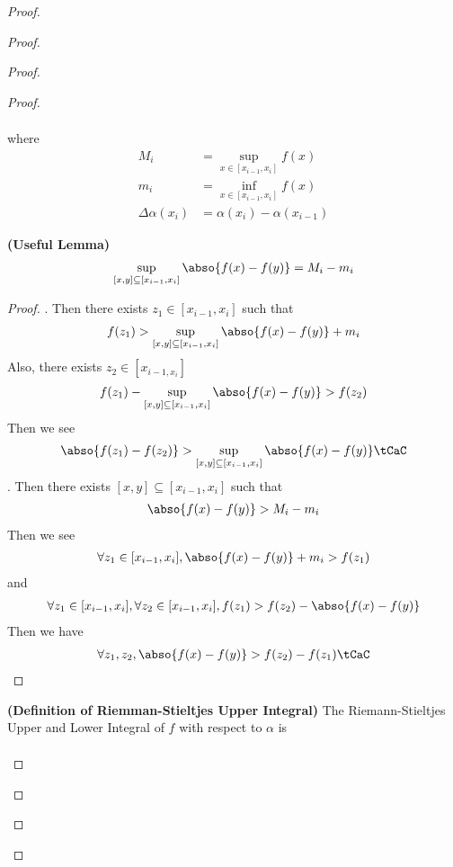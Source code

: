 \documentclass{report}
\begin{document}
\begin{proof}
\begin{proof}
\begin{proof}
\begin{proof}
\begin{definition}
\begin{align*}
\end{align*}
where 
\begin{align*}
  M_i&=\sup_{x\in [x_{i-1},x_i]}f(x)\\
m_i&=\inf_{x\in [x_{i-1},x_i]}f(x)\\
\Delta \alpha (x_i)&=\alpha (x_i)-\alpha (x_{i-1})
\end{align*}
\end{definition}
\begin{theorem}
\label{7.1.7}
\textbf{(Useful Lemma)} 
\begin{align*}
\sup_{[x,y]\subseteq [x_{i-1},x_i]}\abso{f(x)-f(y)}= M_i-m_i
\end{align*}
\end{theorem}
\begin{proof}
. Then there exists $z_1\in [x_{i-1},x_i]$ such that 
\begin{align*}
f(z_1)>\sup_{[x,y]\subseteq [x_{i-1},x_i]}\abso{f(x)-f(y)}+m_i
\end{align*}
Also, there exists $z_2\in [x_{i-1,x_i}]$
\begin{align*}
f(z_1)-\sup_{[x,y]\subseteq [x_{i-1},x_i]}\abso{f(x)-f(y)}>f(z_2)
\end{align*}
Then we see 
\begin{align*}
\abso{f(z_1)-f(z_2)}>\sup_{[x,y]\subseteq [x_{i-1},x_i]}\abso{f(x)-f(y)}\tCaC
\end{align*}
. Then there exists $[x,y]\subseteq [x_{i-1},x_i]$ such that 
\begin{align*}
\abso{f(x)-f(y)}> M_i-m_i
\end{align*}
Then we see 
\begin{align*}
\forall z_1\in [x_{i-1},x_i], \abso{f(x)-f(y)}+m_i>f(z_1)
\end{align*}
and 
\begin{align*}
\forall z_1\in [x_{i-1},x_i],\forall z_2\in [x_{i-1},x_i], f(z_1)>f(z_2)-\abso{f(x)-f(y)}
\end{align*}
Then we have 
\begin{align*}
\forall z_1,z_2, \abso{f(x)-f(y)}>f(z_2)-f(z_1)\tCaC
\end{align*}
\end{proof}
\begin{definition}
\label{7.1.8}
\textbf{(Definition of Riemman-Stieltjes Upper Integral)} The Riemann-Stieltjes Upper and Lower Integral of $f$ with respect to $\alpha $ is 
\begin{align*}

\end{align*}
\end{definition}
\end{proof}
\end{proof}
\end{proof}
\end{proof}
\end{document}
